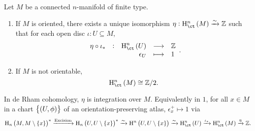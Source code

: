 \begin{theorem}
Let $ M $ be a connected $ n $-manifold of finite type.
\begin{enumerate}
\item If $ M $ is oriented, there exists a unique isomorphism $ \eta : \Hc^n\br{M} \xrightarrow{\sim} \ZZ $ such that for each open disc $ \iota : U \subseteq M $,
$$ \function[\eta \circ \iota_*]{\Hc^n\br{U}}{\ZZ}{\epsilon_U}{1}. $$
\item If $ M $ is not orientable,
$$ \Hc^n\br{M} \cong \ZZ / 2. $$
\end{enumerate}
\end{theorem}

In de Rham cohomology, $ \eta $ is integration over $ M $. Equivalently in $ 1 $, for all $ x \in M $ in a chart $ \cbr{\br{U, \phi}} $ of an orientation-preserving atlas, $ \epsilon_x^+ \mapsto 1 $ via
$$ \H_n\br{M, M \setminus \cbr{x}}^* \xrightarrow{\text{Excision}} \H_n\br{U, U \setminus \cbr{x}}^* \xrightarrow{\sim} \H^n\br{U, U \setminus \cbr{x}} \xrightarrow{\sim} \Hc^n\br{U} \xrightarrow{\iota_*} \Hc^n\br{M} \xrightarrow{\eta} \ZZ. $$

